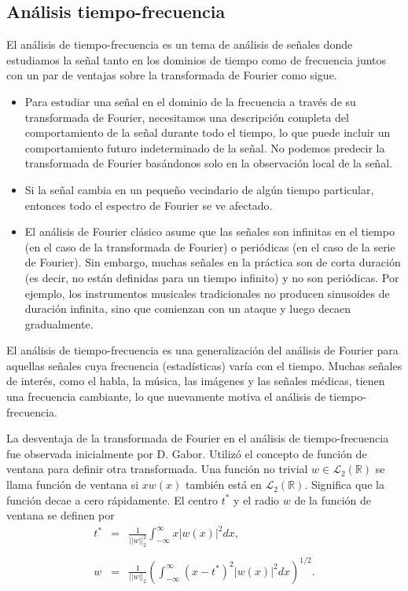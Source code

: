 \begin{multicols}{2}
\section{Análisis tiempo-frecuencia}
El análisis de tiempo-frecuencia es un tema de análisis de señales donde estudiamos la señal tanto en los dominios de tiempo como de frecuencia juntos con un par de ventajas sobre la transformada de Fourier como sigue.

\begin{itemize}
    \item Para estudiar una señal en el dominio de la frecuencia a través de su transformada de Fourier, necesitamos una descripción completa del comportamiento de la señal durante todo el tiempo, lo que puede incluir un comportamiento futuro indeterminado de la señal. No podemos predecir la transformada de Fourier basándonos solo en la observación local de la señal.
    \item  Si la señal cambia en un pequeño vecindario de algún tiempo particular, entonces todo el espectro de Fourier se ve afectado.
    \item El análisis de Fourier clásico asume que las señales son infinitas en el tiempo (en el caso de la transformada de Fourier) o periódicas (en el caso de la serie de Fourier). Sin embargo, muchas señales en la práctica son de corta duración (es decir, no están definidas para un tiempo infinito) y no son periódicas. Por ejemplo, los instrumentos musicales tradicionales no producen sinusoides de duración infinita, sino que comienzan con un ataque y luego decaen gradualmente.  
\end{itemize}

El análisis de tiempo-frecuencia es una generalización del análisis de Fourier para aquellas señales cuya frecuencia (estadísticas) varía con el tiempo. Muchas señales de interés, como el habla, la música, las imágenes y las señales médicas, tienen una frecuencia cambiante, lo que nuevamente motiva el análisis de tiempo-frecuencia.

La desventaja de la transformada de Fourier en el análisis de tiempo-frecuencia fue observada inicialmente por D. Gabor. Utilizó el concepto de función de ventana para definir otra transformada. Una función no trivial $w \in \mathcal{L}_2(\mathbb{R})$ se llama función de ventana si $xw(x)$ también está en $\mathcal{L}_2(\mathbb{R})$. Significa que la función decae a cero rápidamente. El centro $t^*$ y el radio $w$ de la función de ventana se definen por
\begin{equation}
    \begin{array}{rcl}
	t^* &=& \displaystyle\frac{1}{||w||_2^2} \int_{-\infty}^{\infty} x|w(x)|^2 dx,\\\\
	w &=& \displaystyle\frac{1}{||w||_2} \left( \int_{-\infty}^{\infty} (x - t^*)^2 |w(x)|^2 dx \right)^{1/2}.
    \end{array}
    \label{eq:ventana}
\end{equation}


\end{multicols}
